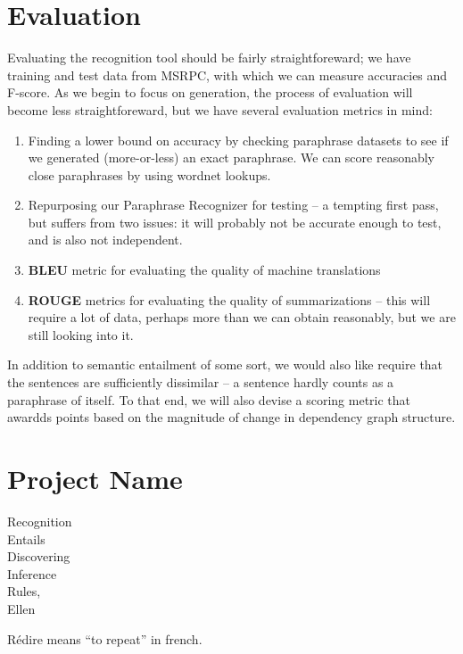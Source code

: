 \documentclass[11pt, reqno]{amsart}
\begin{document}
	\section{Evaluation}
	Evaluating the recognition tool should be fairly straightforeward; we have training and test data from MSRPC, with which we can measure accuracies and F-score. As we begin to focus on generation, the process of evaluation will become less straightforeward, but we have several evaluation metrics in mind:
	\begin{enumerate}
		\item Finding a lower bound on accuracy by checking paraphrase datasets to see if we generated (more-or-less) an exact paraphrase. We can score reasonably close paraphrases by using wordnet lookups.
		\item Repurposing our Paraphrase Recognizer for testing -- a tempting first pass, but suffers from two issues: it will probably not be accurate enough to test, and is also not independent. 
		\item \textbf{BLEU} metric for evaluating the quality of machine translations
		\item \textbf{ROUGE} metrics for evaluating the quality of summarizations -- this will require a lot of data, perhaps more than we can obtain reasonably, but we are still looking into it.
	\end{enumerate}
	In addition to semantic entailment of some sort, we would also like require that the sentences are sufficiently dissimilar -- a sentence hardly counts as a paraphrase of itself. To that end, we will also devise a scoring metric that awardds points based on the magnitude of change in dependency graph structure.

	\section{Project Name}
	\begin{minipage}{10em}
		\noindent Recognition \\
		Entails \\
		Discovering \\
		Inference \\
		Rules, \\
		Ellen 
	\end{minipage}
	R\'{e}dire means ``to repeat'' in french.
	
	
\end{document}
